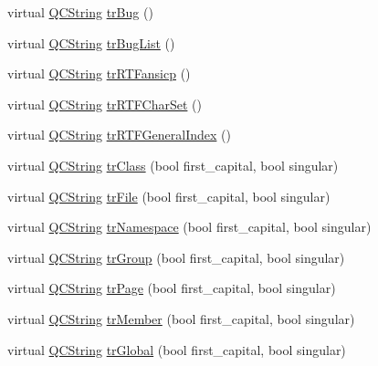 \begin{DoxyCompactItemize}
\item 
virtual \mbox{\hyperlink{class_q_c_string}{Q\+C\+String}} \mbox{\hyperlink{class_translator_slovene_a7a3e82e47f4326d08ee45f263274b840}{tr\+Bug}} ()
\item 
virtual \mbox{\hyperlink{class_q_c_string}{Q\+C\+String}} \mbox{\hyperlink{class_translator_slovene_a9da501f9e0330e1d0c25eac47750da3b}{tr\+Bug\+List}} ()
\item 
virtual \mbox{\hyperlink{class_q_c_string}{Q\+C\+String}} \mbox{\hyperlink{class_translator_slovene_a381c8c7ad7fe0ea5379e1ed062ba0905}{tr\+R\+T\+Fansicp}} ()
\item 
virtual \mbox{\hyperlink{class_q_c_string}{Q\+C\+String}} \mbox{\hyperlink{class_translator_slovene_a3cb28c1244be75e56b524294bf30a5a6}{tr\+R\+T\+F\+Char\+Set}} ()
\item 
virtual \mbox{\hyperlink{class_q_c_string}{Q\+C\+String}} \mbox{\hyperlink{class_translator_slovene_a7bd53d66a1d9a5d62a8f4d8ba9923583}{tr\+R\+T\+F\+General\+Index}} ()
\item 
virtual \mbox{\hyperlink{class_q_c_string}{Q\+C\+String}} \mbox{\hyperlink{class_translator_slovene_aca83a7ce98fb83820789fd863622a564}{tr\+Class}} (bool first\+\_\+capital, bool singular)
\item 
virtual \mbox{\hyperlink{class_q_c_string}{Q\+C\+String}} \mbox{\hyperlink{class_translator_slovene_a2703261492b67ea49cb66a03c7169147}{tr\+File}} (bool first\+\_\+capital, bool singular)
\item 
virtual \mbox{\hyperlink{class_q_c_string}{Q\+C\+String}} \mbox{\hyperlink{class_translator_slovene_a917565a197344303ea7dbdaa12f946f2}{tr\+Namespace}} (bool first\+\_\+capital, bool singular)
\item 
virtual \mbox{\hyperlink{class_q_c_string}{Q\+C\+String}} \mbox{\hyperlink{class_translator_slovene_a18cdf07250591f1b7a1849201753b212}{tr\+Group}} (bool first\+\_\+capital, bool singular)
\item 
virtual \mbox{\hyperlink{class_q_c_string}{Q\+C\+String}} \mbox{\hyperlink{class_translator_slovene_ae26ecc1bf1bbe892497d347910bd930f}{tr\+Page}} (bool first\+\_\+capital, bool singular)
\item 
virtual \mbox{\hyperlink{class_q_c_string}{Q\+C\+String}} \mbox{\hyperlink{class_translator_slovene_a49065c4a9a2eec3961a47bc069f8fcd7}{tr\+Member}} (bool first\+\_\+capital, bool singular)
\item 
virtual \mbox{\hyperlink{class_q_c_string}{Q\+C\+String}} \mbox{\hyperlink{class_translator_slovene_a1e2b491d74de98b7562a21968e1863d0}{tr\+Global}} (bool first\+\_\+capital, bool singular)

\end{DoxyCompactItemize}
